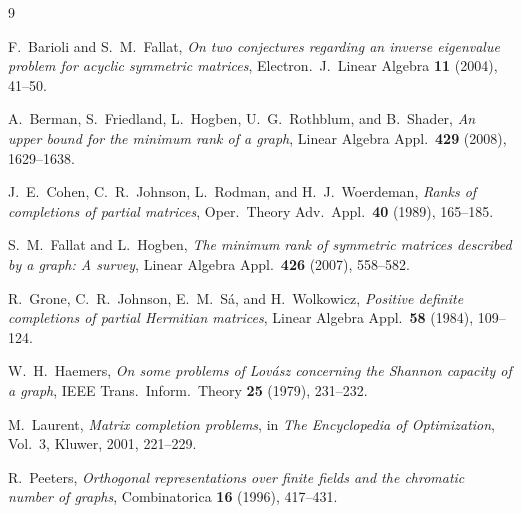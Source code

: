 \documentclass[11pt]{article}
\theoremstyle{definition}
\begin{document}
\begin{thebibliography}{9}

F.~Barioli and S.~M.~Fallat,
\emph{On two conjectures regarding an inverse eigenvalue problem for acyclic symmetric matrices},
Electron.\ J.\ Linear Algebra \textbf{11} (2004), 41--50.

A.~Berman, S.~Friedland, L.~Hogben, U.~G.~Rothblum, and B.~Shader,
\emph{An upper bound for the minimum rank of a graph},
Linear Algebra Appl.\ \textbf{429} (2008), 1629--1638.

J.~E.~Cohen, C.~R.~Johnson, L.~Rodman, and H.~J.~Woerdeman,
\emph{Ranks of completions of partial matrices},
Oper.\ Theory Adv.\ Appl.\ \textbf{40} (1989), 165--185.

S.~M.~Fallat and L.~Hogben,
\emph{The minimum rank of symmetric matrices described by a graph: A survey},
Linear Algebra Appl.\ \textbf{426} (2007), 558--582.

R.~Grone, C.~R.~Johnson, E.~M.~S\'a, and H.~Wolkowicz,
\emph{Positive definite completions of partial Hermitian matrices},
Linear Algebra Appl.\ \textbf{58} (1984), 109--124.

W.~H.~Haemers,
\emph{On some problems of Lov\'asz concerning the Shannon capacity of a graph},
IEEE Trans.\ Inform.\ Theory \textbf{25} (1979), 231--232.

M.~Laurent,
\emph{Matrix completion problems},
in \emph{The Encyclopedia of Optimization}, Vol.~3, Kluwer, 2001, 221--229.

R.~Peeters,
\emph{Orthogonal representations over finite fields and the chromatic number of graphs},
Combinatorica \textbf{16} (1996), 417--431.

\end{thebibliography}
\end{document}
